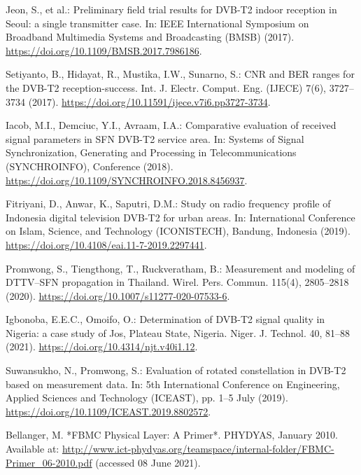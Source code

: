 \documentclass[10pt]{article}
\begin{document}
\begin{thebibliography}{99}
Jeon, S., et al.: Preliminary field trial results for DVB-T2 indoor reception in Seoul: a single transmitter case. In: IEEE International Symposium on Broadband Multimedia Systems and Broadcasting (BMSB) (2017). \href{https://doi.org/10.1109/BMSB.2017.7986186}{https://doi.org/10.1109/BMSB.2017.7986186}.

Setiyanto, B., Hidayat, R., Mustika, I.W., Sunarno, S.: CNR and BER ranges for the DVB-T2 reception-success. Int. J. Electr. Comput. Eng. (IJECE) 7(6), 3727–3734 (2017). \href{https://doi.org/10.11591/ijece.v7i6.pp3727-3734}{https://doi.org/10.11591/ijece.v7i6.pp3727-3734}.

Iacob, M.I., Demciuc, Y.I., Avraam, I.A.: Comparative evaluation of received signal parameters in SFN DVB-T2 service area. In: Systems of Signal Synchronization, Generating and Processing in Telecommunications (SYNCHROINFO), Conference (2018). \href{https://doi.org/10.1109/SYNCHROINFO.2018.8456937}{https://doi.org/10.1109/SYNCHROINFO.2018.8456937}.

Fitriyani, D., Anwar, K., Saputri, D.M.: Study on radio frequency profile of Indonesia digital television DVB-T2 for urban areas. In: International Conference on Islam, Science, and Technology (ICONISTECH), Bandung, Indonesia (2019). \href{https://doi.org/10.4108/eai.11-7-2019.2297441}{https://doi.org/10.4108/eai.11-7-2019.2297441}.

Promwong, S., Tiengthong, T., Ruckveratham, B.: Measurement and modeling of DTTV–SFN propagation in Thailand. Wirel. Pers. Commun. 115(4), 2805–2818 (2020). \href{https://doi.org/10.1007/s11277-020-07533-6}{https://doi.org/10.1007/s11277-020-07533-6}.

Igbonoba, E.E.C., Omoifo, O.: Determination of DVB-T2 signal quality in Nigeria: a case study of Jos, Plateau State, Nigeria. Niger. J. Technol. 40, 81–88 (2021). \href{https://doi.org/10.4314/njt.v40i1.12}{https://doi.org/10.4314/njt.v40i1.12}.

Suwansukho, N., Promwong, S.: Evaluation of rotated constellation in DVB-T2 based on measurement data. In: 5th International Conference on Engineering, Applied Sciences and Technology (ICEAST), pp. 1–5 July (2019). \href{https://doi.org/10.1109/ICEAST.2019.8802572}{https://doi.org/10.1109/ICEAST.2019.8802572}.

Bellanger, M. *FBMC Physical Layer: A Primer*. PHYDYAS, January 2010. Available at:  
\url{http://www.ict-phydyas.org/teamspace/internal-folder/FBMC-Primer_06-2010.pdf} (accessed 08 June 2021).



\end{thebibliography}
\end{document}
